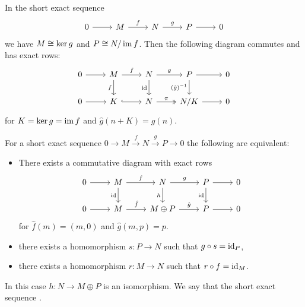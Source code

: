 \begin{remark}
  In the short exact sequence
  \[\begin{tikzcd}
	  0 & M & N & P & 0
	  \arrow[from=1-1, to=1-2]
	  \arrow["f", from=1-2, to=1-3]
	  \arrow["g", from=1-3, to=1-4]
	  \arrow[from=1-4, to=1-5]
	\end{tikzcd}\]
  we have $M \cong \operatorname{ker} g$ and $P \cong N / \operatorname{im} f$.
  Then the following diagram commutes and has exact rows:
  \[\begin{tikzcd}
	  0 & M & N & P & 0 \\
	  0 & K & N & {N/K} & 0
	  \arrow[from=1-1, to=1-2]
	  \arrow["f", from=1-2, to=1-3]
	  \arrow["f"', from=1-2, to=2-2]
	  \arrow["g", from=1-3, to=1-4]
	  \arrow["\id"', from=1-3, to=2-3]
	  \arrow[from=1-4, to=1-5]
	  \arrow["{(\hat{g})^{-1}}"', from=1-4, to=2-4]
	  \arrow[from=2-1, to=2-2]
	  \arrow["", hook, from=2-2, to=2-3]
	  \arrow["\pi", two heads, from=2-3, to=2-4]
	  \arrow[from=2-4, to=2-5]
	\end{tikzcd}\]
  for $K = \operatorname{ker} g = \operatorname{im} f$ and $\hat{g}(n + K) = g(n)$.
\end{remark}

\begin{lemma}
  \label{lemma:koma-01-ses}
  For a short exact sequence $0 \to M \xrightarrow{f} N \xrightarrow{g} P \to 0$
  the following are equivalent:
  \begin{itemize}
  \item There exists a commutative diagram with exact rows
	\[
	  \begin{tikzcd}
		0 & M & N & P & 0 \\
		0 & M & M \oplus P & P & 0
		\arrow[from=1-1, to=1-2]
		\arrow["f", from=1-2, to=1-3]
		\arrow["\id"', from=1-2, to=2-2]
		\arrow["g", from=1-3, to=1-4]
		\arrow["h"', from=1-3, to=2-3]
		\arrow[from=1-4, to=1-5]
		\arrow["\id"', from=1-4, to=2-4]
		\arrow[from=2-1, to=2-2]
		\arrow["\hat{f}", from=2-2, to=2-3]
		\arrow["\hat{g}", from=2-3, to=2-4]
		\arrow[from=2-4, to=2-5]
	  \end{tikzcd}
	\]
	for $\hat{f}(m) = (m, 0)$ and $\hat{g}(m, p) = p$.
  \item there exists a homomorphism $s: P \to N$ such that $g \circ s = \operatorname{id}_P$,
  \item there exists a homomorphism $r: M \to N$ such that $r \circ f = \operatorname{id}_M$.
  \end{itemize}
  In this case $h: N \to M \oplus P$ is an isomorphism.
  We say that the short exact sequence .
\end{lemma}

